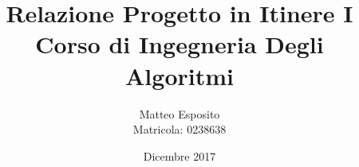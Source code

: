 \documentclass[10pt,a4paper,oneside]{matc3mem}
\begin{document}
\renewcommand\maketitlehooka{\null\mbox{}\vfill}
\renewcommand\maketitlehookd{\vfill\null}

\author{Matteo Esposito \\ Matricola: 0238638}
\title{Relazione Progetto in Itinere I \\
	\large Corso di Ingegneria Degli Algoritmi}
\date{Dicembre 2017}

\frontmatter
\begin{titlingpage}
\maketitle
\end{titlingpage}
\newpage
\tableofcontents

\mainmatter






\backmatter
\end{document}

